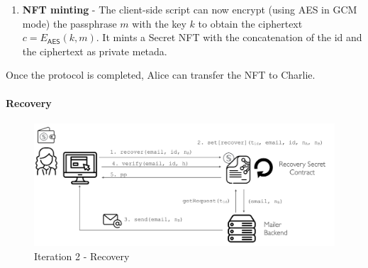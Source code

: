 \documentclass[12pt]{article}
\newcommand{\ms}[1]{\ensuremath{\mathsf{#1}}}
\begin{document}
\begin{enumerate}
\item {\bf NFT minting} - The client-side script can now encrypt (using AES in GCM mode) the passphrase $m$ with the key $k$ to obtain the ciphertext $c=E_{\ms{AES}}(k, m)$. It mints a Secret NFT with the concatenation of the id and the ciphertext as private metada.  
\end{enumerate}

Once the protocol is completed, Alice can transfer the NFT to Charlie. 

\paragraph{Recovery}

\begin{figure}[h!]
  \includegraphics[width=\linewidth]{./media/media-004.png}
  \caption{Iteration 2 - Recovery}
  \label{it2:recovery}
\end{figure}
\end{document}
